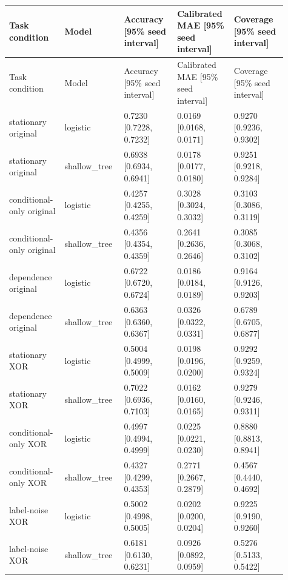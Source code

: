 \documentclass[11pt,a4paper]{article}
\begin{document}
\begingroup\scriptsize
\begin{longtable}{p{0.182\linewidth}p{0.182\linewidth}p{0.182\linewidth}p{0.182\linewidth}p{0.182\linewidth}}
\toprule
Task condition & Model & Accuracy [95\% seed interval] & Calibrated MAE [95\% seed interval] & Coverage [95\% seed interval] \\
\midrule
\endfirsthead
\toprule
Task condition & Model & Accuracy [95\% seed interval] & Calibrated MAE [95\% seed interval] & Coverage [95\% seed interval] \\
\midrule
\endhead
stationary original & logistic & 0.7230 [0.7228, 0.7232] & 0.0169 [0.0168, 0.0171] & 0.9270 [0.9236, 0.9302] \\
stationary original & shallow\_\allowbreak{}tree & 0.6938 [0.6934, 0.6941] & 0.0178 [0.0177, 0.0180] & 0.9251 [0.9218, 0.9284] \\
conditional-only original & logistic & 0.4257 [0.4255, 0.4259] & 0.3028 [0.3024, 0.3032] & 0.3103 [0.3086, 0.3119] \\
conditional-only original & shallow\_\allowbreak{}tree & 0.4356 [0.4354, 0.4359] & 0.2641 [0.2636, 0.2646] & 0.3085 [0.3068, 0.3102] \\
dependence original & logistic & 0.6722 [0.6720, 0.6724] & 0.0186 [0.0184, 0.0189] & 0.9164 [0.9126, 0.9203] \\
dependence original & shallow\_\allowbreak{}tree & 0.6363 [0.6360, 0.6367] & 0.0326 [0.0322, 0.0331] & 0.6789 [0.6705, 0.6877] \\
stationary XOR & logistic & 0.5004 [0.4999, 0.5009] & 0.0198 [0.0196, 0.0200] & 0.9292 [0.9259, 0.9324] \\
stationary XOR & shallow\_\allowbreak{}tree & 0.7022 [0.6936, 0.7103] & 0.0162 [0.0160, 0.0165] & 0.9279 [0.9246, 0.9311] \\
conditional-only XOR & logistic & 0.4997 [0.4994, 0.4999] & 0.0225 [0.0221, 0.0230] & 0.8880 [0.8813, 0.8941] \\
conditional-only XOR & shallow\_\allowbreak{}tree & 0.4327 [0.4299, 0.4353] & 0.2771 [0.2667, 0.2879] & 0.4567 [0.4440, 0.4692] \\
label-noise XOR & logistic & 0.5002 [0.4998, 0.5005] & 0.0202 [0.0200, 0.0204] & 0.9225 [0.9190, 0.9260] \\
label-noise XOR & shallow\_\allowbreak{}tree & 0.6181 [0.6130, 0.6231] & 0.0926 [0.0892, 0.0959] & 0.5276 [0.5133, 0.5422] \\
\bottomrule
\end{longtable}
\endgroup
\end{document}
